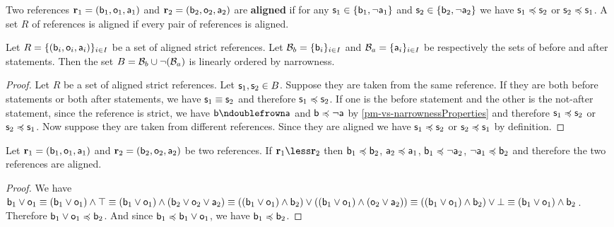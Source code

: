 \begin{mathSection}
	\begin{defn}
		Two references $\refStmt_1 = (\stmt[b]_1, \stmt[o]_1, \stmt[a]_1)$ and $\refStmt_2 = (\stmt[b]_2, \stmt[o]_2, \stmt[a]_2)$ are \textbf{aligned} if for any $\stmt_1 \in \{ \stmt[b]_1, \NOT\stmt[a]_1\}$ and $\stmt_2 \in \{ \stmt[b]_2, \NOT\stmt[a]_2\}$ we have 
		$\stmt_1 \narrower \stmt_2$ or $\stmt_2 \narrower \stmt_1$. A set $R$ of references is aligned if every pair of references is aligned.
	\end{defn}
	\begin{prop}\label{pm-pq-strictAlignmentIsOrdering}
		Let $R = \{(\stmt[b]_i, \stmt[o]_i, \stmt[a]_i)\}_{i\in I}$ be a set of aligned strict references. Let $\basis_b = \{\stmt[b]_i\}_{i\in I}$ and $\basis_a = \{\stmt[a]_i\}_{i\in I}$ be respectively the sets of before and after statements. Then the set $B = \basis_b \cup \NOT (\basis_a)$ is linearly ordered by narrowness.
	\end{prop}
	\begin{proof}
		Let $R$ be a set of aligned strict references. Let $\stmt_1, \stmt_2 \in B$. Suppose they are taken from the same reference. If they are both before statements or both after statements, we have $\stmt_1 \equiv \stmt_2$ and therefore $\stmt_1 \narrower \stmt_2$. If one is the before statement and the other is the not-after statement, since the reference is strict, we have $\stmt[b] \ncomp \stmt[a]$ and $\stmt[b] \narrower \NOT\stmt[a]$ by \ref{pm-vs-narrownessProperties} and therefore $\stmt_1 \narrower \stmt_2$ or $\stmt_2 \narrower \stmt_1$. Now suppose they are taken from different references. Since they are aligned we have  $\stmt_1 \narrower \stmt_2$ or $\stmt_2 \narrower \stmt_1$ by definition.
	\end{proof}
	
	\begin{prop}\label{pm-pq-orderedReferencesAreAligned}
		Let $\refStmt_1 = ( \stmt[b]_1, \stmt[o]_1, \stmt[a]_1 )$ and $\refStmt_2 = ( \stmt[b]_2, \stmt[o]_2, \stmt[a]_2 )$ be two references. If $\refStmt_1 \less \refStmt_2$ then $\stmt[b]_1 \narrower \stmt[b]_2$, $\stmt[a]_2 \narrower \stmt[a]_1$, $\stmt[b]_1 \narrower \NOT \stmt[a]_2$, $\NOT \stmt[a]_1 \narrower \stmt[b]_2$ and therefore the two references are aligned.
	\end{prop}
	\begin{proof}
		We have $\stmt[b]_1 \OR \stmt[o]_1 \equiv (\stmt[b]_1 \OR \stmt[o]_1) \AND \certainty \equiv (\stmt[b]_1 \OR \stmt[o]_1) \AND (\stmt[b]_2 \OR \stmt[o]_2 \OR \stmt[a]_2) \equiv ((\stmt[b]_1 \OR \stmt[o]_1) \AND \stmt[b]_2) \OR ((\stmt[b]_1 \OR \stmt[o]_1) \AND (\stmt[o]_2 \OR \stmt[a]_2)) \equiv ((\stmt[b]_1 \OR \stmt[o]_1) \AND \stmt[b]_2) \OR \impossibility \equiv (\stmt[b]_1 \OR \stmt[o]_1) \AND \stmt[b]_2$. Therefore $\stmt[b]_1 \OR \stmt[o]_1 \narrower \stmt[b]_2$. And since $\stmt[b]_1 \narrower \stmt[b]_1 \OR \stmt[o]_1$, we have $\stmt[b]_1 \narrower \stmt[b]_2$.
		

\end{proof}
\end{mathSection}
